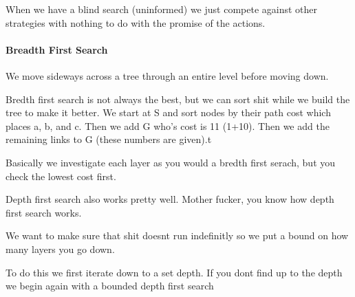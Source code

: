 \documentclass[12pt]{article}
\begin{document}


When we have a blind search (uninformed) we just compete against other strategies with nothing to do with the promise of the actions. 


\paragraph{Breadth First Search} %
\label{par:breadth_first_search}
We move sideways across a tree through an entire level before moving down. 


Bredth first search is not always the best, but we can sort shit while we build the tree to make it better. We start at S and sort nodes by their path cost which places a, b, and c. Then we add G who's cost is 11 (1+10). Then we add the remaining links to G (these numbers are given).t


Basically we investigate each layer as you would a bredth first serach, but you check the lowest cost first.



Depth first search also works pretty well. Mother fucker, you know how depth first search works.



We want to make sure that shit doesnt run indefinitly so we put a bound on how many layers you go down. 


To do this we first iterate down to a set depth. If you dont find up to the depth we begin again with a bounded depth first search 
\end{document}
